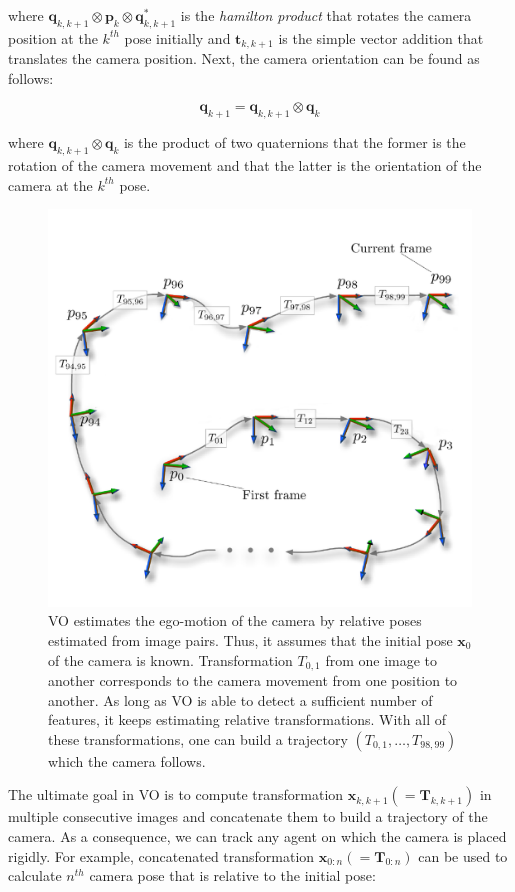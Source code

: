 \documentclass[a4paper]{report}
\numberwithin{figure}{section}
\begin{document}
where $\mathbf{q}_{k,k+1} \otimes \mathbf{p}_k \otimes \mathbf{q}_{k,k+1}^*$ 
is the \textit{hamilton product} that rotates the camera position at the 
$k^{th}$ pose initially and $\mathbf{t}_{k,k+1}$ is the simple vector addition 
that 
translates the camera position. Next, the camera orientation can be found as 
follows:

\begin{equation}\label{eq:rotation_cam}
  \mathbf{q}_{k+1} = 
  \mathbf{q}_{k,k+1} \otimes \mathbf{q}_{k}
\end{equation}

where $\mathbf{q}_{k,k+1} \otimes \mathbf{q}_{k}$ is the product of two 
quaternions that the former is the rotation of the camera movement and that 
the latter is the 
orientation of the camera at the $k^{th}$ pose.

\begin{figure}[H]
	\centering
  \includegraphics[width=0.7\linewidth,natwidth=640,natheight=640]
  {fig/drawings/rel_pose.pdf}
  \caption[Trajectory From Relative Pose]
  {VO estimates the ego-motion of the camera by relative poses estimated from  
  image pairs. Thus, it assumes that the initial pose $\mathbf{x}_0$ of the 
  camera is 
  known. Transformation $T_{0,1}$ from one image to another corresponds to the 
  camera movement from one position to another. As long as VO is able to 
  detect a sufficient number of features, it keeps estimating relative 
  transformations. With all of these transformations, one can build a 
  trajectory $(T_{0,1}, \dots, T_{98,99})$ which the camera follows.}
	\label{fig:transformation_ij}
\end{figure}

The ultimate goal in VO is to compute transformation 
$\mathbf{x}_{k,k+1}(=\mathbf{T}_{k,k+1})$ in 
multiple consecutive images and concatenate them to build a trajectory of the 
camera. As a consequence, we can track any agent on which the camera is placed 
rigidly. For example, concatenated transformation 
$\mathbf{x}_{0:n}(=\mathbf{T}_{0:n})$ can be 
used to calculate $n^{th}$ camera pose that is relative to the initial pose:
\end{document}
